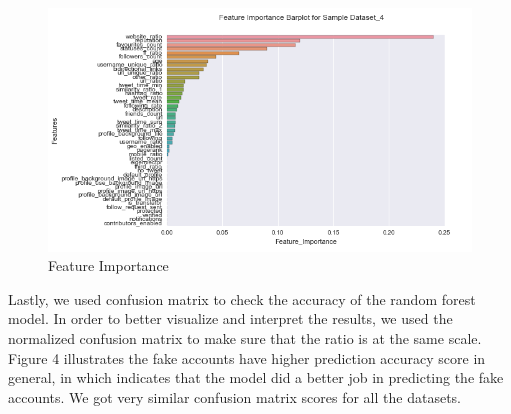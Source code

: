 \documentclass[a4paper, 12pt]{report}
\begin{document}
\begin{figure}[h!]
	\centering
	\includegraphics[scale=0.7]{feature_4}
	\caption{Feature Importance}
\end{figure}

\noindent Lastly, we used confusion matrix to check the accuracy of the random forest model. In order to better visualize and interpret the results, we used the normalized confusion matrix to make sure that the ratio is at the same scale. Figure 4 illustrates the fake accounts have higher prediction accuracy score in general, in which indicates that the model did a better job in predicting the fake accounts. We got very similar confusion matrix scores for all the datasets. 
\end{document}
